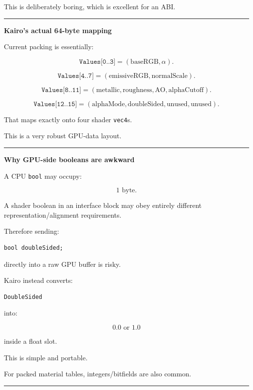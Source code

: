 This is deliberately boring, which is excellent for an ABI.

\begin{center}\rule{0.5\linewidth}{0.5pt}\end{center}

\textbf{Kairo's actual 64-byte mapping}

Current packing is essentially:

\[
\texttt{Values[0..3]}
=
(\text{baseRGB},\alpha).
\]

\[
\texttt{Values[4..7]}
=
(\text{emissiveRGB},\text{normalScale}).
\]

\[
\texttt{Values[8..11]}
=
(\text{metallic},
\text{roughness},
\text{AO},
\text{alphaCutoff}).
\]

\[
\texttt{Values[12..15]}
=
(\text{alphaMode},
\text{doubleSided},
\text{unused},\text{unused}).
\]

That maps exactly onto four shader \texttt{vec4}s.

This is a very robust GPU-data layout.

\begin{center}\rule{0.5\linewidth}{0.5pt}\end{center}

\textbf{Why GPU-side booleans are awkward}

A CPU \texttt{bool} may occupy:

\[
1\text{ byte}.
\]

A shader boolean in an interface block may obey entirely different representation/alignment requirements.

Therefore sending:

\begin{verbatim}
bool doubleSided;
\end{verbatim}

directly into a raw GPU buffer is risky.

Kairo instead converts:

\begin{verbatim}
DoubleSided
\end{verbatim}

into:

\[
0.0\text{ or }1.0
\]

inside a float slot.

This is simple and portable.

For packed material tables, integers/bitfields are also common.

\begin{center}\rule{0.5\linewidth}{0.5pt}\end{center}

